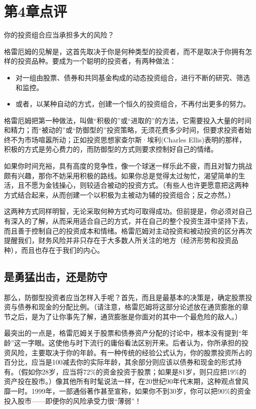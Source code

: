 \documentclass[12pt,oneside]{book}
\begin{document}
\section{第4章点评}
你的投资组合应当承担多大的风险？

格雷厄姆的见解是，这首先取决于你是何种类型的投资者，而不是取决于你拥有怎样的投资品种。要成为一个聪明的投资者，有两种做法：

\begin{itemize}
\item 对一组由股票、债券和共同基金构成的动态投资组合，进行不断的研究、筛选和监控。
\item 或者，以某种自动的方式，创建一个恒久的投资组合，不再付出更多的努力。
\end{itemize}

格雷厄姆把第一种做法，叫做“积极的”或“进取的”的方法，它需要投入大量的时间和精力；而“被动的”或“防御型的”投资策略，无须花费多少时间，但要求投资者始终不为市场喧嚣所动；正如投资思想家查尔斯·埃利(Charles Ellis)表明的那样，积极的方式是劳心费力的，而防御型的方式则要求控制好自己的情绪。

如果你时间充裕，具有高度的竞争性，像一个球迷一样乐此不疲，而且对智力挑战颇有兴趣，那你不妨采用积极的路线。如果你总是觉得太过匆忙，渴望简单的生活，且不愿为金钱操心，则较适合被动的投资方式。（有些人也许更愿意把这两种方式结合起来，从而创建一个以积极为主被动为辅的投资组合；反之亦然。）

这两种方式同样明智，无论采取何种方式均可取得成功。但前提是，你必须对自己有深入的了解，从而采用适合自己的方式，并在自己的整个投资生涯中坚持下去，而且善于控制自己的投资成本和情绪。格雷厄姆对主动投资和被动投资的区分再次提醒我们，财务风险并非只存在于大多数人所关注的地方（经济形势和投资品种），而且也存在于我们的内心。

\subsection{是勇猛出击，还是防守}
那么，防御型投资者应当怎样入手呢？首先，而且是最基本的决策是，确定股票投资与债券和现金的分配比例。（请注意，格雷厄姆将这部分论述放在通货膨胀的章节之后，是为了让你事先了解，通货膨胀是你面对的其中一个最危险的敌人。）

最突出的一点是，格雷厄姆关于股票和债券资产分配的讨论中，根本没有提到“年龄”这一字眼。这使他与时下流行的庸俗看法区别开来。后者认为，你所承担的投资风险，主要取决于你的年龄。有一种传统的经验公式认为，你的股票投资所占的百分比，应当是100减去你的实际年龄，其余部分则应该以债券和现金的形式持有。（假如你28岁，应当将72\%的资金投资于股票；如果是81岁，则只应把19\%的资产投在股市。）像其他所有时髦说法一样，在20世纪90年代末期，这种观点曾风靡一时。1999年，一部通俗著作甚至宣称，如果你不到30岁，你可以把90\%的资金投入股市——即便你的风险承受力很“薄弱”！
\end{document}
